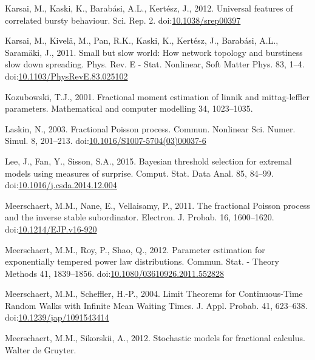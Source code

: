 \documentclass[]{elsarticle} %
\begin{document}
\leavevmode\hypertarget{ref-Karsai2012}{}%
Karsai, M., Kaski, K., Barabási, A.L., Kertész, J., 2012. Universal
features of correlated bursty behaviour. Sci. Rep. 2.
doi:\href{https://doi.org/10.1038/srep00397}{10.1038/srep00397}

\leavevmode\hypertarget{ref-Karsai2011}{}%
Karsai, M., Kivelä, M., Pan, R.K., Kaski, K., Kertész, J., Barabási,
A.L., Saramäki, J., 2011. Small but slow world: How network topology and
burstiness slow down spreading. Phys. Rev. E - Stat. Nonlinear, Soft
Matter Phys. 83, 1--4.
doi:\href{https://doi.org/10.1103/PhysRevE.83.025102}{10.1103/PhysRevE.83.025102}

\leavevmode\hypertarget{ref-kozubowski2001}{}%
Kozubowski, T.J., 2001. Fractional moment estimation of linnik and
mittag-leffler parameters. Mathematical and computer modelling 34,
1023--1035.

\leavevmode\hypertarget{ref-Laskin2003}{}%
Laskin, N., 2003. Fractional Poisson process. Commun. Nonlinear Sci.
Numer. Simul. 8, 201--213.
doi:\href{https://doi.org/10.1016/S1007-5704(03)00037-6}{10.1016/S1007-5704(03)00037-6}

\leavevmode\hypertarget{ref-Lee15}{}%
Lee, J., Fan, Y., Sisson, S.A., 2015. Bayesian threshold selection for
extremal models using measures of surprise. Comput. Stat. Data Anal. 85,
84--99.
doi:\href{https://doi.org/10.1016/j.csda.2014.12.004}{10.1016/j.csda.2014.12.004}

\leavevmode\hypertarget{ref-Meerschaert2010b}{}%
Meerschaert, M.M., Nane, E., Vellaisamy, P., 2011. The fractional
Poisson process and the inverse stable subordinator. Electron. J.
Probab. 16, 1600--1620.
doi:\href{https://doi.org/10.1214/EJP.v16-920}{10.1214/EJP.v16-920}

\leavevmode\hypertarget{ref-MeerschaertRoyQin}{}%
Meerschaert, M.M., Roy, P., Shao, Q., 2012. Parameter estimation for
exponentially tempered power law distributions. Commun. Stat. - Theory
Methods 41, 1839--1856.
doi:\href{https://doi.org/10.1080/03610926.2011.552828}{10.1080/03610926.2011.552828}

\leavevmode\hypertarget{ref-limitCTRW}{}%
Meerschaert, M.M., Scheffler, H.-P., 2004. Limit Theorems for
Continuous-Time Random Walks with Infinite Mean Waiting Times. J. Appl.
Probab. 41, 623--638.
doi:\href{https://doi.org/10.1239/jap/1091543414}{10.1239/jap/1091543414}

\leavevmode\hypertarget{ref-MeerschaertSikorskii}{}%
Meerschaert, M.M., Sikorskii, A., 2012. Stochastic models for fractional
calculus. Walter de Gruyter.
\end{document}

